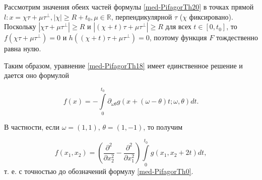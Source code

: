 Рассмотрим значения обеих частей формулы \eqref{med-PifagorTh20} в точках прямой $l: x=\chi\tau+\mu\tau^\bot, |\chi|\geq R+t_0, \mu\in\mathbb R$, перпендикулярной $\tau$ ($\chi$ фиксировано). Поскольку $|\chi\tau+\mu\tau^\bot|\geq R$ и $|(\chi+t)\tau+\mu\tau^\bot|\geq R$ для всех $t\in[0,t_0]$, то $f(\chi\tau+\mu\tau^\bot)=0$ и $h((\chi+t)\tau+\mu\tau^\bot)=0$, поэтому функция $F$ тождественно равна нулю.

Таким образом, уравнение \eqref{med-PifagorTh18} имеет единственное решение и дается оно формулой

$$f(x)=-\int\limits_0^{t_0}\partial_{\omega\theta}g (x+(\omega-\theta)t;\omega,\theta)dt.$$

В частности, если $\omega=(1,1), \,\theta=(1,-1)$, то получим

$$f(x_1, x_2)=\left( \frac{\partial^2}{\partial x_2^2}-\frac{\partial^2}{\partial x_1^2}\right)\int\limits_0^{t_0}g(x_1,x_2+2t)dt,$$
т. е. с точностью до обозначений формулу \eqref{med-PifagorTh0}. 